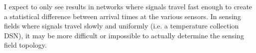 I expect to only see results in networks where signals travel fast enough to create a statistical difference between arrival times at the various sensors. In sensing fields where signals travel slowly and uniformly (i.e. a temperature collection DSN), it may be more difficult or impossible to actually determine the sensing field topology.
